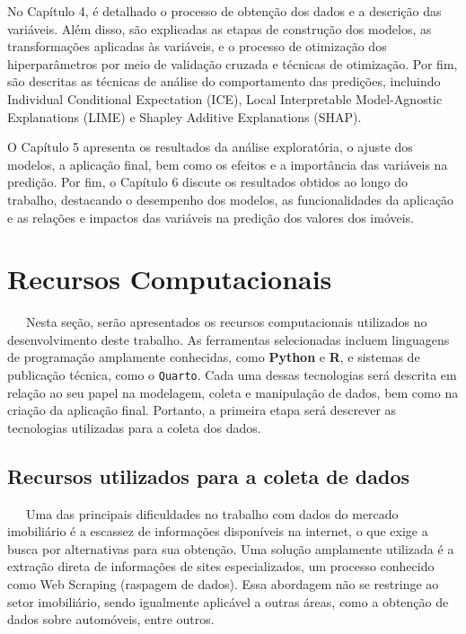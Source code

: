 \documentclass[
  12pt,
  a4paper,
]{scrreprt}
\begin{document}
\vspace{12pt}

No Capítulo 4, é detalhado o processo de obtenção dos dados e a
descrição das variáveis. Além disso, são explicadas as etapas de
construção dos modelos, as transformações aplicadas às variáveis, e o
processo de otimização dos hiperparâmetros por meio de validação cruzada
e técnicas de otimização. Por fim, são descritas as técnicas de análise
do comportamento das predições, incluindo Individual Conditional
Expectation (ICE), Local Interpretable Model-Agnostic Explanations
(LIME) e Shapley Additive Explanations (SHAP).

\vspace{12pt}

O Capítulo 5 apresenta os resultados da análise exploratória, o ajuste
dos modelos, a aplicação final, bem como os efeitos e a importância das
variáveis na predição. Por fim, o Capítulo 6 discute os resultados
obtidos ao longo do trabalho, destacando o desempenho dos modelos, as
funcionalidades da aplicação e as relações e impactos das variáveis na
predição dos valores dos imóveis.

\chapter{Recursos Computacionais}\label{recursos-computacionais}

~~~Nesta seção, serão apresentados os recursos computacionais utilizados
no desenvolvimento deste trabalho. As ferramentas selecionadas incluem
linguagens de programação amplamente conhecidas, como \textbf{Python} e
\textbf{R}, e sistemas de publicação técnica, como o \texttt{Quarto}.
Cada uma dessas tecnologias será descrita em relação ao seu papel na
modelagem, coleta e manipulação de dados, bem como na criação da
aplicação final. Portanto, a primeira etapa será descrever as
tecnologias utilizadas para a coleta dos dados.

\section{Recursos utilizados para a coleta de
dados}\label{recursos-utilizados-para-a-coleta-de-dados}

~~~Uma das principais dificuldades no trabalho com dados do mercado
imobiliário é a escassez de informações disponíveis na internet, o que
exige a busca por alternativas para sua obtenção. Uma solução amplamente
utilizada é a extração direta de informações de sites especializados, um
processo conhecido como Web Scraping (raspagem de dados). Essa abordagem
não se restringe ao setor imobiliário, sendo igualmente aplicável a
outras áreas, como a obtenção de dados sobre automóveis, entre outros.
\end{document}

